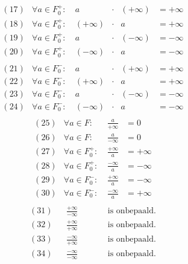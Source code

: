 \documentclass[main.tex]{subfiles}
\begin{document}
\begin{st}
\[\begin{array}{crccccl}
  \end{array}
  \]
  \[
  \begin{array}{crccccl}
    (17) & \forall a \in F_{0}^{+}:\ & a         &\cdot& (+\infty) &= + \infty \\
    (18) & \forall a \in F_{0}^{+}:\ & (+\infty) &\cdot& a         &= + \infty \\
    (19) & \forall a \in F_{0}^{+}:\ & a         &\cdot& (-\infty) &= - \infty \\
    (20) & \forall a \in F_{0}^{+}:\ & (-\infty) &\cdot& a         &= - \infty \\
  \end{array}
  \]
  \[
  \begin{array}{crccccl}
    (21) & \forall a \in F_{0}^{-}:\ & a         &\cdot& (+\infty) &= + \infty \\
    (22) & \forall a \in F_{0}^{-}:\ & (+\infty) &\cdot& a         &= + \infty \\
    (23) & \forall a \in F_{0}^{-}:\ & a         &\cdot& (-\infty) &= - \infty \\
    (24) & \forall a \in F_{0}^{-}:\ & (-\infty) &\cdot& a         &= - \infty \\
  \end{array}
  \]
  \[
  \begin{array}{crccccl}
    (25) & \forall a \in F:\        & \frac{a}{+\infty}      &= 0 \\
    (26) & \forall a \in F:\        & \frac{a}{-\infty}      &= 0 \\
    (27) & \forall a \in F_{0}^{+}:\ & \frac{+\infty}{a}      &= +\infty \\
    (28) & \forall a \in F_{0}^{+}:\ & \frac{-\infty}{a}      &= -\infty \\
    (29) & \forall a \in F_{0}^{-}:\ & \frac{+\infty}{a}      &= -\infty \\
    (30) & \forall a \in F_{0}^{-}:\ & \frac{-\infty}{a}      &= +\infty \\
  \end{array}
  \]
  \[
  \begin{array}{crccccl}
    (31) &                          & \frac{+\infty}{-\infty} &&&& \text{ is onbepaald.}\\
    (32) &                          & \frac{+\infty}{+\infty} &&&& \text{ is onbepaald.}\\
    (33) &                          & \frac{-\infty}{+\infty} &&&& \text{ is onbepaald.}\\
    (34) &                          & \frac{-\infty}{-\infty} &&&& \text{ is onbepaald.}\\

\end{array}\]
\end{st}
\end{document}
